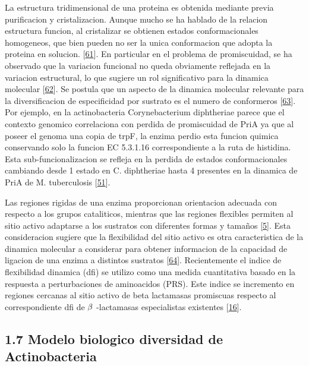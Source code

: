 \documentclass[12pt,twoside]{reedthesis}
\begin{document}
  La estructura tridimensional de una proteina es obtenida mediante previa
  purificacion y cristalizacion. Aunque mucho se ha hablado de la relacion
  estructura funcion, al cristalizar se obtienen estados conformacionales
  homogeneos, que bien pueden no ser la unica conformacion que adopta la
  proteina en solucion.
  {[}\protect\hyperlink{ref-jamesux5fconformationalux5f2003}{61}{]}. En
  particular en el problema de promiscuidad, se ha observado que la
  variacion funcional no queda obviamente reflejada en la variacion
  estructural, lo que sugiere un rol significativo para la dinamica
  molecular
  {[}\protect\hyperlink{ref-parisiux5fconformationalux5f2015}{62}{]}. Se
  postula que un aspecto de la dinamica molecular relevante para la
  diversificacion de especificidad por sustrato es el numero de
  conformeros
  {[}\protect\hyperlink{ref-javierux5fzeaux5fproteinux5f2013}{63}{]}. Por
  ejemplo, en la actinobacteria Corynebacterium diphtheriae parece que el
  contexto genomico correlaciona con perdida de promiscuidad de PriA ya
  que al poseer el genoma una copia de trpF, la enzima perdio esta funcion
  quimica conservando solo la funcion EC 5.3.1.16 correspondiente a la
  ruta de histidina. Esta sub-funcionalizacion se refleja en la perdida de
  estados conformacionales cambiando desde 1 estado en C. diphtheriae
  hasta 4 presentes en la dinamica de PriA de M. tuberculosis
  {[}\protect\hyperlink{ref-noda-garciaux5fevolutionux5f2013}{51}{]}.
  
  Las regiones rigidas de una enzima proporcionan orientacion adecuada con
  respecto a los grupos cataliticos, mientras que las regiones flexibles
  permiten al sitio activo adaptarse a los sustratos con diferentes formas
  y tamaños {[}\protect\hyperlink{ref-copleyux5fenzymesux5f2003}{5}{]}.
  Esta consideracion sugiere que la flexibilidad del sitio activo es otra
  caracteristica de la dinamica molecular a considerar para obtener
  informacion de la capacidad de ligacion de una enzima a distintos
  sustratos
  {[}\protect\hyperlink{ref-gatti-lafranconiux5fflexibilityux5f2013}{64}{]}.
  Recientemente el indice de flexibilidad dinamica (dfi) se utilizo como
  una medida cuantitativa basado en la respuesta a perturbaciones de
  aminoacidos (PRS). Este indice se incremento en regiones cercanas al
  sitio activo de beta lactamasas promiscuas respecto al correspondiente
  dfi de \(\noindent\beta\) -lactamasas especialistas existentes
  {[}\protect\hyperlink{ref-zouux5fevolutionux5f2015}{16}{]}.
  
  \subsection{1.7 Modelo biologico diversidad de
  Actinobacteria}\label{modelo-biologico-diversidad-de-actinobacteria}
  
\end{document}
